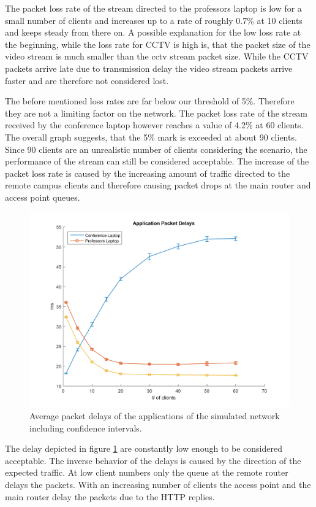 \documentclass[
10pt, %
a4paper, %
oneside, %
headinclude,footinclude, %
BCOR5mm, %
]{scrartcl}
\begin{document}
The packet loss rate of the stream directed to the professors laptop is low for a small number of clients and increases up to a rate of roughly 0.7\% at 10 clients and keeps steady from there on. A possible explanation for the low loss rate at the beginning, while the loss rate for CCTV is high is, that the packet size of the video stream is much smaller than the cctv stream packet size. While the CCTV packets arrive late due to transmission delay the video stream packets arrive faster and are therefore not considered lost.

The before mentioned loss rates are far below our threshold of 5\%. Therefore they are not a limiting factor on the network. The packet loss rate of the stream received by the conference laptop however reaches a value of 4.2\% at 60 clients. The overall graph suggests, that the 5\% mark is exceeded at about 90 clients. Since 90 clients are an unrealistic number of clients considering the scenario, the performance of the stream can still be considered acceptable. The increase of the packet loss rate is caused by the increasing amount of traffic directed to the remote campus clients and therefore causing packet drops at the main router and access point queues.
\begin{figure}[!ht]
  \centering
  \includegraphics[width=\textwidth]{Figures/cctv/Application_Packet_Delays.png}
  \caption{Average packet delays of the applications of the simulated network including confidence intervals.} \label{fig:cctv_app_packet_delays}
\end{figure}

The delay depicted in figure \ref{fig:cctv_app_packet_delays} are constantly low enough to be considered acceptable. The inverse behavior of the delays is caused by the direction of the expected traffic. At low client numbers only the queue at the remote router delays the packets. With an increasing number of clients the access point and the main router delay the packets due to the HTTP replies.
\end{document}
